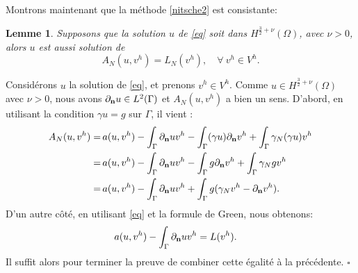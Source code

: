 \documentclass[11pt]{book}
\newtheorem{lemma}[theorem]{Lemme}
\newtheorem{remark}[theorem]{Remarque}
\newcommand{\br}{\begin{remark}}
\newcommand{\er}{\end{remark}}
\newcommand{\bl}{\begin{lemma}}
\newcommand{\el}{\end{lemma}}
\newcommand{\cqfd}{{$\mbox{}$\hfill$\square$}}
\def\n{{\bf n}}
\def\G{{\Gamma}}
\newcommand{\Pgh}{P_{\gamma}}
\newcommand{\Agh}{A_{N}}
\newcommand{\dnu}{\partial_{\n} u}
\newcommand{\dnv}{\partial_{\n} v}
\begin{document}

Montrons maintenant que la méthode \eqref{nitsche2} est consistante:

\bl
Supposons que la solution $u$ de
\eqref{eq} soit dans $H^{\frac32+\nu}(\Omega)$, avec $\nu > 0$, alors $u$ est aussi 
solution de
\begin{equation*} 
A_N (u,v^h)
= L_N (v^h),
\quad \forall \: v^h \in V^h.
\end{equation*}
\el

\proof 
Considérons $u$ la solution de \eqref{eq}, et prenons $v^h \in V^h$. 
Comme $u \in H^{\frac32+\nu}(\Omega)$ avec $\nu>0$, nous avons
$\dnu \in L^2(\G)$ et $A_N (u, v^h)$ a bien un sens. 
D'abord, en utilisant la condition $\gamma u = g$ sur $\Gamma$, il vient :
 \begin{align*}
  A_N (u,v^h) %
=\, &
a(u,v^h) - \int_\Gamma \dnu v^h - \int_\Gamma (\gamma u) \dnv^h + \int_\Gamma \gamma_N (\gamma u) v^h\\
=\, &
a(u,v^h) - \int_\Gamma \dnu v^h - \int_\Gamma g \dnv^h + \int_\Gamma \gamma_N g v^h\\
=\, &
a(u,v^h) - \int_\Gamma \dnu v^h + \int_\Gamma  g ( \gamma_N v^h - \dnv^h ).
\end{align*}
D'un autre côté, en utilisant \eqref{eq} et la formule de Green, nous obtenons:
\begin{align*}
 & a(u,v^h) 
 - \int_\Gamma \dnu v^h = L(v^h).
\end{align*}
Il suffit alors pour terminer la preuve de combiner cette égalité à la précédente.
\cqfd
\end{document}
